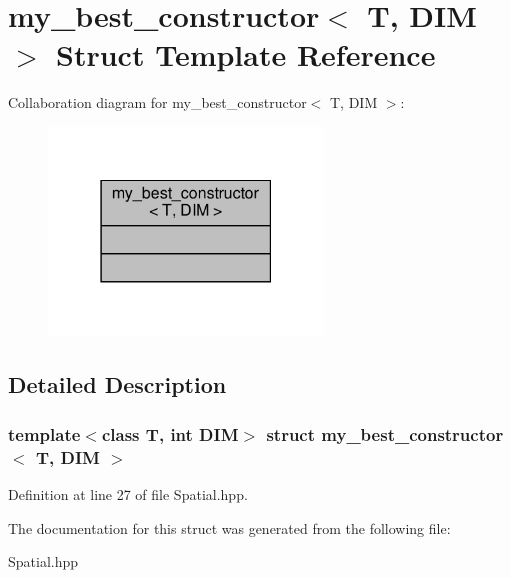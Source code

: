 \hypertarget{structmy__best__constructor}{}\section{my\+\_\+best\+\_\+constructor$<$ T, D\+IM $>$ Struct Template Reference}
\label{structmy__best__constructor}


Collaboration diagram for my\+\_\+best\+\_\+constructor$<$ T, D\+IM $>$\+:\nopagebreak
\begin{figure}[H]
\begin{center}
\leavevmode
\includegraphics[width=207pt]{structmy__best__constructor__coll__graph}
\end{center}
\end{figure}


\subsection{Detailed Description}
\subsubsection*{template$<$class T, int D\+IM$>$\newline
struct my\+\_\+best\+\_\+constructor$<$ T, D\+I\+M $>$}



Definition at line 27 of file Spatial.\+hpp.



The documentation for this struct was generated from the following file\+:\begin{DoxyCompactItemize}
\item 
Spatial.\+hpp\end{DoxyCompactItemize}
